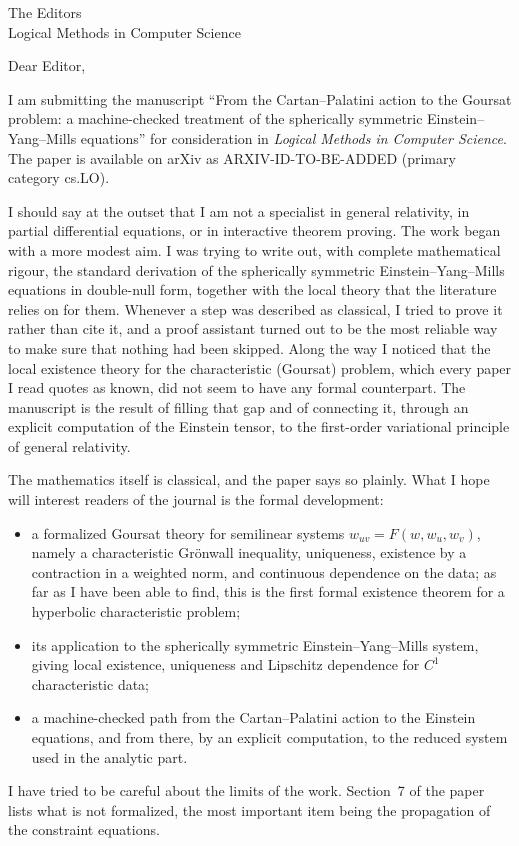\documentclass[11pt]{letter}
\begin{document}
\begin{letter}{The Editors\\Logical Methods in Computer Science}

\opening{Dear Editor,}

I am submitting the manuscript ``From the Cartan--Palatini action to the Goursat problem: a machine-checked treatment of the spherically symmetric Einstein--Yang--Mills equations'' for consideration in \emph{Logical Methods in Computer Science}. The paper is available on arXiv as ARXIV-ID-TO-BE-ADDED (primary category cs.LO).

I should say at the outset that I am not a specialist in general relativity, in partial differential equations, or in interactive theorem proving. The work began with a more modest aim. I was trying to write out, with complete mathematical rigour, the standard derivation of the spherically symmetric Einstein--Yang--Mills equations in double-null form, together with the local theory that the literature relies on for them. Whenever a step was described as classical, I tried to prove it rather than cite it, and a proof assistant turned out to be the most reliable way to make sure that nothing had been skipped. Along the way I noticed that the local existence theory for the characteristic (Goursat) problem, which every paper I read quotes as known, did not seem to have any formal counterpart. The manuscript is the result of filling that gap and of connecting it, through an explicit computation of the Einstein tensor, to the first-order variational principle of general relativity.

The mathematics itself is classical, and the paper says so plainly. What I hope will interest readers of the journal is the formal development:
\begin{itemize}[leftmargin=1.5em,itemsep=2pt]
\item a formalized Goursat theory for semilinear systems $w_{uv}=F(w,w_u,w_v)$, namely a characteristic Gr\"onwall inequality, uniqueness, existence by a contraction in a weighted norm, and continuous dependence on the data; as far as I have been able to find, this is the first formal existence theorem for a hyperbolic characteristic problem;
\item its application to the spherically symmetric Einstein--Yang--Mills system, giving local existence, uniqueness and Lipschitz dependence for $C^1$ characteristic data;
\item a machine-checked path from the Cartan--Palatini action to the Einstein equations, and from there, by an explicit computation, to the reduced system used in the analytic part.
\end{itemize}
I have tried to be careful about the limits of the work. Section~7 of the paper lists what is not formalized, the most important item being the propagation of the constraint equations.


\end{letter}
\end{document}

